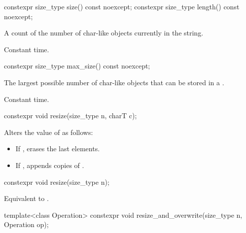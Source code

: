 %
%
\begin{itemdecl}
constexpr size_type size() const noexcept;
constexpr size_type length() const noexcept;
\end{itemdecl}

\begin{itemdescr}
\pnum
\returns
A count of the number of char-like objects currently in the string.

\pnum
\complexity
Constant time.
\end{itemdescr}

%
\begin{itemdecl}
constexpr size_type max_size() const noexcept;
\end{itemdecl}

\begin{itemdescr}
\pnum
\returns
The largest possible number of char-like objects that can be stored in a
.

\pnum
\complexity
Constant time.
\end{itemdescr}

%
\begin{itemdecl}
constexpr void resize(size_type n, charT c);
\end{itemdecl}

\begin{itemdescr}
\pnum
\effects
Alters the value of
as follows:
\begin{itemize}
\item
If
,
erases the last  elements.
\item
If
,
appends  copies of .
\end{itemize}
\end{itemdescr}

%
\begin{itemdecl}
constexpr void resize(size_type n);
\end{itemdecl}

\begin{itemdescr}
\pnum
\effects
Equivalent to .
\end{itemdescr}

%
\begin{itemdecl}
template<class Operation> constexpr void resize_and_overwrite(size_type n, Operation op);
\end{itemdecl}

